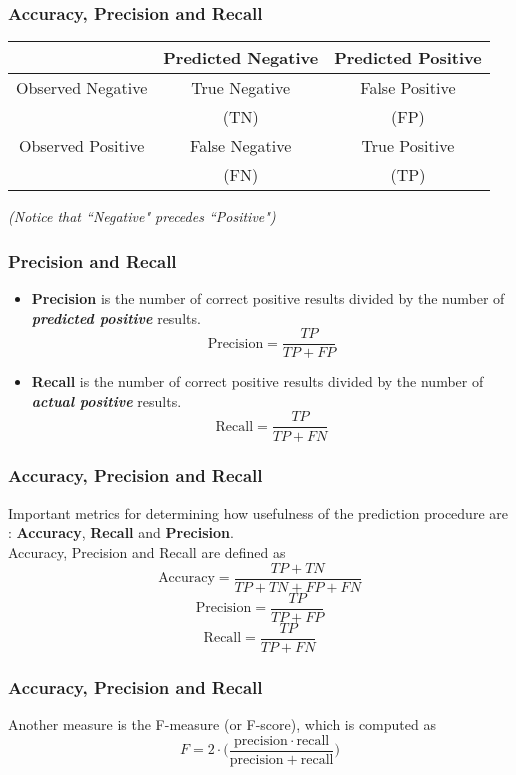 \documentclass[a4]{beamer}
\begin{document}
\begin{frame}
	\frametitle{Accuracy, Precision and Recall}
	\large
	\begin{center}
		\begin{tabular}{|c|c|c|}
			\hline  & Predicted Negative & Predicted Positive \\ 
			\hline Observed Negative & True Negative & False Positive \\
			& (TN) & (FP)  
			\\
			\hline Observed Positive & False Negative & True Positive \\ 
			& (FN) & (TP)  \\
			\hline 
		\end{tabular} 
	\end{center}
\textit{	(Notice that ``Negative" precedes ``Positive")}
\end{frame}
\begin{frame}
	\frametitle{Precision and Recall}
	\Large
	\begin{itemize}
		\item \textbf{Precision} is the number of correct positive results divided by the number of \textit{\textbf{predicted positive}} results.
		\[ \mbox{Precision}= \frac{TP}{TP+FP}  \]
		\item \textbf{Recall} is the number of correct positive results divided by the number of \textit{\textbf{actual positive}} results. 
		\[ \mbox{Recall}= \frac{TP}{TP+FN}  \]
	\end{itemize}
\end{frame}
\begin{frame}
	\frametitle{Accuracy, Precision and Recall}
	\large
	Important metrics for determining how usefulness of the prediction procedure are : \textbf{Accuracy}, \textbf{Recall} and \textbf{Precision}.
	\\ \bigskip
	Accuracy, Precision and Recall are defined as
	\[\mbox{Accuracy}=\frac{TP+TN}{TP+TN+FP+FN} \]
	\[\mbox{Precision}=\frac{TP}{TP+FP} \] 
	\[\mbox{Recall}=\frac{TP}{TP+FN} \]
\end{frame}
\begin{frame}
	\frametitle{Accuracy, Precision and Recall}
	Another measure is the F-measure (or F-score), which is computed as
	\[F = 2 \cdot \bigg( \frac{\mathrm{precision} \cdot \mathrm{recall}}{ \mathrm{precision} + \mathrm{recall}} \bigg)\]
	
\end{frame}
\end{document}
